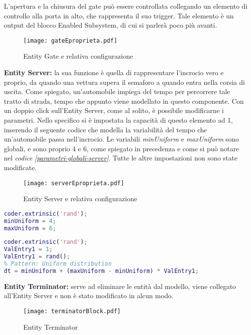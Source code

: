 L’apertura e la chiusura del gate può essere controllata collegando un elemento di controllo alla porta in alto, che rappresenta il suo trigger. Tale elemento è un output del blocco Enabled Subsystem, di cui si parlerà poco più avanti.
\newline
\begin{figure}[H]
  \texttt{[image: gateEproprieta.pdf]}
  \caption{Entity Gate e relativa configurazione}
  \label{fig:entitygateprops}
\end{figure}
\newpage
\textbf{Entity Server\cite{entityserver}:} la sua funzione è quella di rappresentare l’incrocio vero e proprio, da quando una vettura supera il semaforo a quando entra nella corsia di uscita. Come spiegato, un’automobile impiega del tempo per percorrere tale tratto di strada, tempo che appunto viene modellato in questo componente. Con un doppio click sull’Entity Server, come al solito, è possibile modificarne i parametri. Nello specifico si è impostata la capacità di questo elemento ad 1, inserendo il seguente codice che modella la variabilità del tempo che un’automobile passa nell’incrocio. Le variabili \textit{minUniform} e \textit{maxUniform} sono globali, e sono proprio 4 e 6, come spiegato in precedenza e come si può notare nel \textit{codice \ref{parametri-globali-server}}.
Tutte le altre impostazioni non sono state modificate.
\begin{figure}[H]
  \texttt{[image: serverEproprieta.pdf]}
  \caption{Entity Server e relativa configurazione}
  \label{fig:entityserverprops}
\end{figure}
\begin{lstlisting}[language=Matlab,label=parametri-globali-server,caption=Codice relativo ai parametri globali dell'Entity Server]
coder.extrinsic('rand');
minUniform = 4;
maxUniform = 6;
\end{lstlisting}
\begin{lstlisting}[language=Matlab,label=codiceentityserver,caption=Codice inserito negli Entity Server]
    coder.extrinsic('rand');
ValEntry1 = 1;
ValEntry1 = rand();
% Pattern: Uniform distribution
dt = minUniform + (maxUniform - minUniform) * ValEntry1;
\end{lstlisting}

\textbf{Entity Terminator\cite{entityterminator}:} serve ad eliminare le entità dal modello, viene collegato all’Entity Server e non è stato modificato in alcun modo.
\newline
\begin{figure}[H]
\center
  \texttt{[image: terminatorBlock.pdf]}
  \caption{Entity Terminator}
  \label{fig:terminatorblock}
\end{figure}



